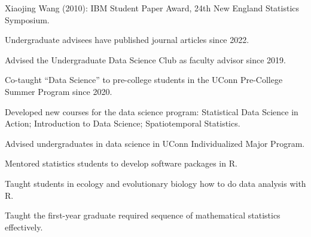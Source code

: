 \documentclass[Statistics]{vita}
\begin{document}
\begin{vita}
\begin{TeachingAccomplishments}
\begin{StudentAwards}
    \item Xiaojing Wang (2010): IBM Student Paper Award, 24th New England Statistics Symposium.
    \end{StudentAwards}
    \begin{TeachingHighlights}
    \item Undergraduate advisees have published journal articles since 2022.
    \item Advised the Undergraduate Data Science Club as faculty advisor since 2019.
    \item Co-taught ``Data Science'' to pre-college students in the UConn Pre-College Summer Program since 2020.
    \item Developed new courses for the data science program: Statistical Data Science in Action; Introduction to Data Science; Spatiotemporal Statistics.
    \item Advised undergraduates in data science in UConn Individualized Major Program.
    \item Mentored statistics students to develop software packages in R.
    \item Taught students in ecology and evolutionary biology how to do data analysis with R.
    \item Taught the first-year graduate required sequence of mathematical statistics effectively.
    \end{TeachingHighlights}

\end{TeachingAccomplishments}
\end{vita}
\end{document}
